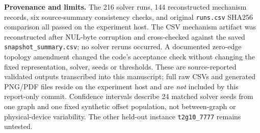 \noindent\textbf{Provenance and limits.}
The 216 solver runs, 144 reconstructed mechanism records, six
source-summary consistency checks, and original \texttt{runs.csv}
SHA256 comparison all passed on the experiment host.
The CSV mechanism artifact was reconstructed after
NUL-byte corruption and cross-checked against the
saved \texttt{snapshot\_summary.csv}; no solver reruns occurred.
A documented zero-edge topology amendment changed the code's
acceptance check without changing the fixed representation,
solver, seeds or thresholds. These are source-reported
validated outputs transcribed into this manuscript; full raw
CSVs and generated PNG/PDF files reside on the experiment host
and are \emph{not} included by this report-only commit.
Confidence intervals describe 24 matched solver seeds from
one graph and one fixed synthetic offset population, not
between-graph or physical-device variability. The other
held-out instance \texttt{t2g10\_7777} remains untested.
